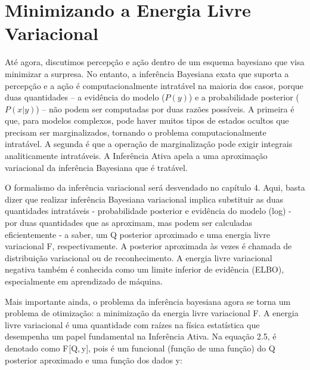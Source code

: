 \documentclass[
  12pt,
]{book}
\begin{document}
\hypertarget{minimizando-a-energia-livre-variacional}{%
\section{Minimizando a Energia Livre Variacional}\label{minimizando-a-energia-livre-variacional}}

Até agora, discutimos percepção e ação dentro de um esquema bayesiano que visa minimizar a surpresa. No entanto, a inferência Bayesiana exata que suporta a percepção e a ação é computacionalmente intratável na maioria dos casos, porque duas quantidades -- a evidência do modelo (\(P( y)\)) e a probabilidade posterior (\(P(x | y)\)) -- não podem ser computadas por duas razões possíveis. A primeira é que, para modelos complexos, pode haver muitos tipos de estados ocultos que precisam ser marginalizados, tornando o problema computacionalmente intratável. A segunda é que a operação de marginalização pode exigir integrais analiticamente intratáveis. A Inferência Ativa apela a uma aproximação variacional da inferência Bayesiana que é tratável.

O formalismo da inferência variacional será desvendado no capítulo 4. Aqui, basta dizer que realizar inferência Bayesiana variacional implica substituir as duas quantidades intratáveis - probabilidade posterior e evidência do modelo (log) - por duas quantidades que as aproximam, mas podem ser calculadas eficientemente - a saber, um Q posterior aproximado e uma energia livre variacional F, respectivamente. A posterior aproximada às vezes é chamada de distribuição variacional ou de reconhecimento. A energia livre variacional negativa também é conhecida como um limite inferior de evidência (ELBO), especialmente em aprendizado de máquina.

Mais importante ainda, o problema da inferência bayesiana agora se torna um problema de otimização: a minimização da energia livre variacional F. A energia livre variacional é uma quantidade com raízes na física estatística que desempenha um papel fundamental na Inferência Ativa. Na equação 2.5, é denotado como F {[}Q, y{]}, pois é um funcional (função de uma função) do Q posterior aproximado e uma função dos dados y:
\end{document}
